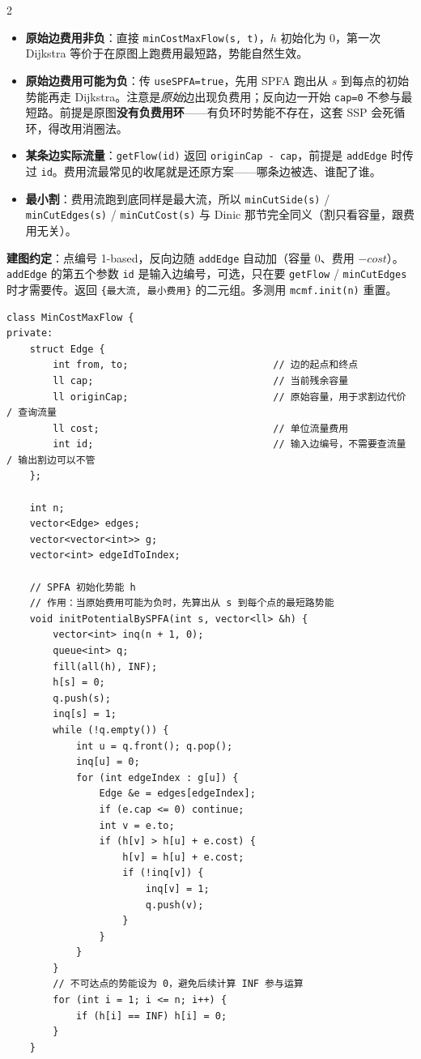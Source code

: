 \begin{multicols*}{2}
		\begin{itemize}
			\item \textbf{原始边费用非负}：直接 \texttt{minCostMaxFlow(s, t)}，$h$ 初始化为 $0$，第一次 Dijkstra 等价于在原图上跑费用最短路，势能自然生效。
			\item \textbf{原始边费用可能为负}：传 \texttt{useSPFA=true}，先用 SPFA 跑出从 $s$ 到每点的初始势能再走 Dijkstra。注意是\emph{原始}边出现负费用；反向边一开始 \texttt{cap=0} 不参与最短路。前提是原图\textbf{没有负费用环}——有负环时势能不存在，这套 SSP 会死循环，得改用消圈法。
			\item \textbf{某条边实际流量}：\texttt{getFlow(id)} 返回 \texttt{originCap - cap}，前提是 \texttt{addEdge} 时传过 \texttt{id}。费用流最常见的收尾就是还原方案——哪条边被选、谁配了谁。
			\item \textbf{最小割}：费用流跑到底同样是最大流，所以 \texttt{minCutSide(s)} / \texttt{minCutEdges(s)} / \texttt{minCutCost(s)} 与 Dinic 那节完全同义（割只看容量，跟费用无关）。
		\end{itemize}

		\textbf{建图约定}：点编号 1-based，反向边随 \texttt{addEdge} 自动加（容量 $0$、费用 $-cost$）。\texttt{addEdge} 的第五个参数 \texttt{id} 是输入边编号，可选，只在要 \texttt{getFlow} / \texttt{minCutEdges} 时才需要传。返回 \texttt{\{最大流, 最小费用\}} 的二元组。多测用 \texttt{mcmf.init(n)} 重置。

		\begin{verbatim}
class MinCostMaxFlow {
private:
    struct Edge {
        int from, to;                         // 边的起点和终点
        ll cap;                               // 当前残余容量
        ll originCap;                         // 原始容量，用于求割边代价 / 查询流量
        ll cost;                              // 单位流量费用
        int id;                               // 输入边编号，不需要查流量 / 输出割边可以不管
    };

    int n;
    vector<Edge> edges;
    vector<vector<int>> g;
    vector<int> edgeIdToIndex;

    // SPFA 初始化势能 h
    // 作用：当原始费用可能为负时，先算出从 s 到每个点的最短路势能
    void initPotentialBySPFA(int s, vector<ll> &h) {
        vector<int> inq(n + 1, 0);
        queue<int> q;
        fill(all(h), INF);
        h[s] = 0;
        q.push(s);
        inq[s] = 1;
        while (!q.empty()) {
            int u = q.front(); q.pop();
            inq[u] = 0;
            for (int edgeIndex : g[u]) {
                Edge &e = edges[edgeIndex];
                if (e.cap <= 0) continue;
                int v = e.to;
                if (h[v] > h[u] + e.cost) {
                    h[v] = h[u] + e.cost;
                    if (!inq[v]) {
                        inq[v] = 1;
                        q.push(v);
                    }
                }
            }
        }
        // 不可达点的势能设为 0，避免后续计算 INF 参与运算
        for (int i = 1; i <= n; i++) {
            if (h[i] == INF) h[i] = 0;
        }
    }


\end{verbatim}
\end{multicols*}
